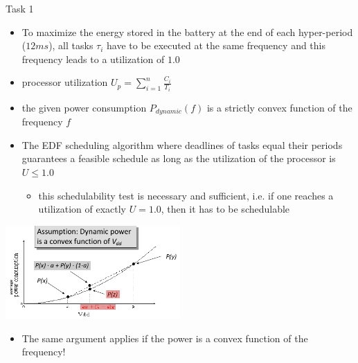 \begin{frame}[allowframebreaks]{Task 1}{}
  \framebreak
  \begin{tasknoinc}
    \begin{itemize}
      \item To maximize the energy stored in the battery at the end of each hyper-period ($12 ms$), all tasks $ \tau_i$ have to be executed at the same frequency and this frequency leads to a utilization of $1.0$
    \end{itemize}
  \end{tasknoinc}
  \framebreak
  \begin{requirementsnoinc}
    \begin{itemize}
      \item \alert{processor utilization} $\displaystyle U_p = \sum_{i=1}^n \frac{C_i}{T_i}$
      \item the given power consumption $P_{dynamic}(f)$ is a \alert{strictly convex} function of the frequency $f$
      \item The EDF scheduling algorithm where deadlines of tasks equal their periods guarantees a feasible schedule as long as the utilization of the processor is $U \le 1.0$
        \begin{itemize}
          \item this schedulability test is \alert{necessary} and \alert{sufficient}, i.e. if one reaches a utilization of exactly $U = 1.0$, then it has to be schedulable
        \end{itemize}
    \end{itemize}
  \end{requirementsnoinc}
  \begin{requirementsnoinc}
    \centering
    \includegraphics[width=0.5\textwidth]{./figures/task2_power_convex.png}
    \begin{itemize}
        \item The same argument applies if the power is a convex function of the \alert{frequency}!
    \end{itemize}
  \end{requirementsnoinc}
  \begin{solutionnoinc}
    \begin{itemize}

\end{itemize}
\end{solutionnoinc}
\end{frame}
